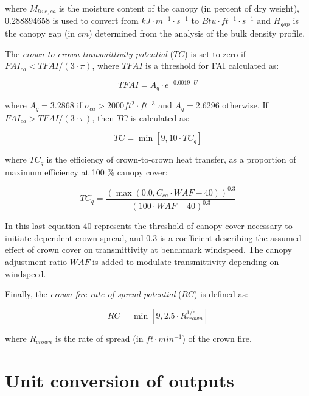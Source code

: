 \documentclass[]{book}
\begin{document}
where \(M_{live, ca}\) is the moisture content of the canopy (in percent
of dry weight), 0.288894658 is used to convert from
\(kJ \cdot m^{-1}\cdot s^{-1}\) to \(Btu \cdot ft^{-1}\cdot s^{-1}\) and
\(H_{gap}\) is the canopy gap (in \(cm\)) determined from the analysis
of the bulk density profile.

The \emph{crown-to-crown transmittivity potential} (\(TC\)) is set to
zero if \(FAI_{ca} < TFAI/(3\cdot \pi)\), where \(TFAI\) is a threshold
for FAI calculated as:

\begin{equation}
TFAI = A_{q}\cdot e^{-0.0019 \cdot U}
\end{equation}

where \(A_{q} = 3.2868\) if \(\sigma_{ca} > 2000 ft^{2}\cdot ft^{-3}\)
and \(A_{q} = 2.6296\) otherwise. If \(FAI_{ca} > TFAI/(3\cdot \pi)\),
then \(TC\) is calculated as:

\begin{equation}
TC = \min \left[ 9, 10 \cdot TC_q \right]
\end{equation}

where \(TC_q\) is the efficiency of crown-to-crown heat transfer, as a
proportion of maximum efficiency at 100 \% canopy cover:

\begin{equation}
TC_q = \frac{(\max(0.0, C_{ca}\cdot WAF - 40))^{0.3}}{(100 \cdot WAF -40)^{0.3}}
\end{equation}

In this last equation 40 represents the threshold of canopy cover
necessary to initiate dependent crown spread, and 0.3 is a coefficient
describing the assumed effect of crown cover on transmittivity at
benchmark windspeed. The canopy adjustment ratio \(WAF\) is added to
modulate transmittivity depending on windspeed.

Finally, the \emph{crown fire rate of spread potential} (\(RC\)) is
defined as:

\begin{equation}
RC = \min \left[ 9, 2.5 \cdot R_{crown}^{1/e} \right]
\end{equation}

where \(R_{crown}\) is the rate of spread (in \(ft \cdot min^{-1}\)) of
the crown fire.

\section{Unit conversion of outputs}\label{unit-conversion-of-outputs}
\end{document}
